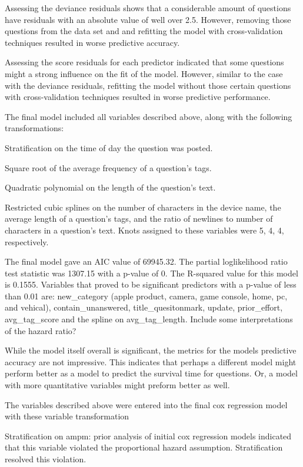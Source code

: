 \documentclass[12pt]{article}
\begin{document}
Assessing the deviance residuals shows that a considerable amount of questions have residuals with an absolute value of well over 2.5. However, removing those questions from the data set and and refitting the model with cross-validation techniques resulted in worse predictive accuracy. 

Assessing the score residuals for each predictor indicated that some questions might a strong influence on the fit of the model. However, similar to the case with the deviance residuals, refitting the model without those certain questions with cross-validation techniques resulted in worse predictive performance.

The final model included all variables described above, along with the following transformations: 

Stratification on the time of day the question was posted. 

Square root of the average frequency of a question's tags. 

Quadratic polynomial on the length of the question's text. 

Restricted cubic splines on the number of characters in the device name, the average length of a question's tags, and the ratio of newlines to number of characters in a question's text. Knots assigned to these variables were 5, 4, 4, respectively. 

The final model gave an AIC value of 69945.32. The partial loglikelihood ratio test statistic was 1307.15 with a p-value of 0. The R-squared value for this model is 0.1555. Variables that proved to be significant predictors with a p-value of less than 0.01 are: new_category (apple product, camera, game console, home, pc, and vehical), contain_unanswered, title_quesitonmark, update, prior_effort, avg_tag_score and the spline on avg_tag_length. Include some interpretations of the hazard ratio? 

While the model itself overall is significant, the metrics for the models predictive accuracy are not impressive. This indicates that perhaps a different model might perform better as a model to predict the survival time for questions. Or, a model with more quantitative variables might preform better as well.  



The variables described above were entered into the final cox regression model with these variable transformation

Stratification on ampm: prior analysis of initial cox regression models indicated that this variable violated the proportional hazard assumption. Stratification resolved this violation.
\end{document}

